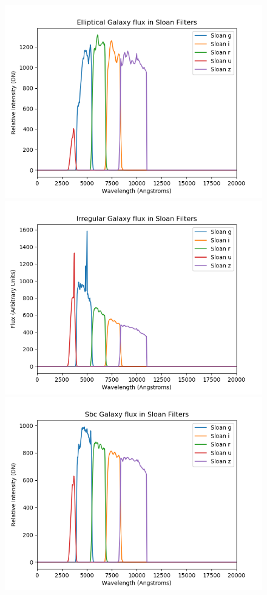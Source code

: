 \documentclass[12pt]{article}
\begin{document}
\begin{center}
	\begin{figure}[H]
	\includegraphics[scale=0.5]{El_sloan.png}
	\includegraphics[scale=0.5]{Irr_sloan.png}
	\includegraphics[scale=0.5]{Sbc_sloan.png}

\end{figure}
\end{center}
\end{document}
